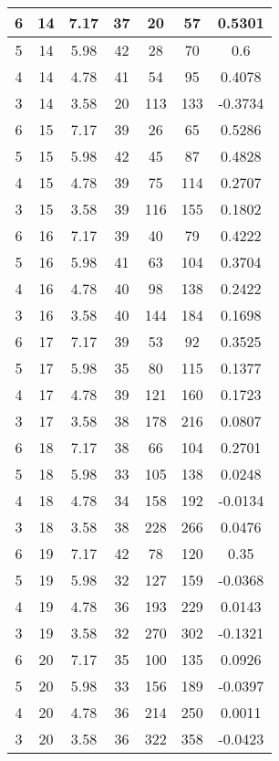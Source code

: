 \documentclass[letterpaper, 12pt]{article}
\begin{document}
\begin{longtable}{|c|c|c|c|c|c|c|}
\hline
6 & 14 & 7.17 & 37 & 20 & 57 & 0.5301 \\
\hline
5 & 14 & 5.98 & 42 & 28 & 70 & 0.6 \\
\hline
4 & 14 & 4.78 & 41 & 54 & 95 & 0.4078 \\
\hline
3 & 14 & 3.58 & 20 & 113 & 133 & -0.3734 \\
\hline
6 & 15 & 7.17 & 39 & 26 & 65 & 0.5286 \\
\hline
5 & 15 & 5.98 & 42 & 45 & 87 & 0.4828 \\
\hline
4 & 15 & 4.78 & 39 & 75 & 114 & 0.2707 \\
\hline
3 & 15 & 3.58 & 39 & 116 & 155 & 0.1802 \\
\hline
6 & 16 & 7.17 & 39 & 40 & 79 & 0.4222 \\
\hline
5 & 16 & 5.98 & 41 & 63 & 104 & 0.3704 \\
\hline
4 & 16 & 4.78 & 40 & 98 & 138 & 0.2422 \\
\hline
3 & 16 & 3.58 & 40 & 144 & 184 & 0.1698 \\
\hline
6 & 17 & 7.17 & 39 & 53 & 92 & 0.3525 \\
\hline
5 & 17 & 5.98 & 35 & 80 & 115 & 0.1377 \\
\hline
4 & 17 & 4.78 & 39 & 121 & 160 & 0.1723 \\
\hline
3 & 17 & 3.58 & 38 & 178 & 216 & 0.0807 \\
\hline
6 & 18 & 7.17 & 38 & 66 & 104 & 0.2701 \\
\hline
5 & 18 & 5.98 & 33 & 105 & 138 & 0.0248 \\
\hline
4 & 18 & 4.78 & 34 & 158 & 192 & -0.0134 \\
\hline
3 & 18 & 3.58 & 38 & 228 & 266 & 0.0476 \\
\hline
6 & 19 & 7.17 & 42 & 78 & 120 & 0.35 \\
\hline
5 & 19 & 5.98 & 32 & 127 & 159 & -0.0368 \\
\hline
4 & 19 & 4.78 & 36 & 193 & 229 & 0.0143 \\
\hline
3 & 19 & 3.58 & 32 & 270 & 302 & -0.1321 \\
\hline
6 & 20 & 7.17 & 35 & 100 & 135 & 0.0926 \\
\hline
5 & 20 & 5.98 & 33 & 156 & 189 & -0.0397 \\
\hline
4 & 20 & 4.78 & 36 & 214 & 250 & 0.0011 \\
\hline
3 & 20 & 3.58 & 36 & 322 & 358 & -0.0423 \\
\hline
\end{longtable}
\end{document}
